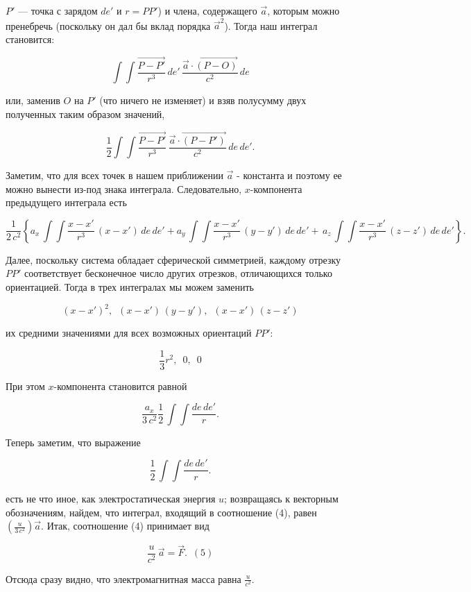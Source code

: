 \documentclass[11pt]{article}
\begin{document}
\(P'\) --- точка с зарядом \(de'\) и \(r = PP'\)) и члена, содержащего
\(\vec {a}\), которым можно пренебречь (поскольку он дал бы вклад порядка
\({\vec {a}}^2\)). Тогда наш интеграл становится:

\[\int \int\frac{\overrightarrow{P-P'}}{r^3}\,de' \, \frac{\vec {a} \cdot \overrightarrow{\left(P - O\right)}}{c^2} \, de\]

    или, заменив \(O\) на \(P'\) (что ничего не изменяет) и взяв полусумму
двух полученных таким образом значений,

\[\frac{1}{2} \int \int\frac{\overrightarrow{P-P'}}{r^3} \, \frac{\vec {a} \cdot \overrightarrow{\left(P - P'\right)}}{c^2} \, de\,de'.\]

    Заметим, что для всех точек в нашем приближении \(\vec {a}\) - константа и
поэтому ее можно вынести из-под знака интеграла. Следовательно,
\(x\)-компонента предыдущего интеграла есть

\[\frac{1}{2 \, c^2} \left\{
a_x \, \int \int\frac{{x-x'}}{r^3} \, { {\left(x - x'\right)}} \, de\,de'
+
a_y \, \int \int\frac{{x-x'}}{r^3} \, { {\left(y - y'\right)}} \, de\,de'
+
\, a_z \, \int \int\frac{{x-x'}}{r^3} \, { {\left(z - z'\right)}} \, de\,de'
\right\}.\]

    Далее, поскольку система обладает сферической симметрией, каждому
отрезку \(PP'\) соответствует бесконечное число других отрезков,
отличающихся только ориентацией. Тогда в трех интегралах мы можем
заменить

\[\left(x-x'\right)^2, \,\,\,
\left(x-x'\right) \, \left(y - y'\right), \,\,\,
\left(x-x'\right) \, \left(z - z'\right)\]

их средними значениями для всех возможных ориентаций \(PP'\):

\[\frac{1}{3}r^2, \,\,\,0, \,\,\,0\]

При этом \(x\)-компонента становится равной

\[\frac{a_x}{3 \, c^2}\frac{1}{2} \, \int \int\frac{{de\,de'}}{r}.\]

Теперь заметим, что выражение

\[\frac{1}{2} \, \int \int\frac{{de\,de'}}{r}.\]

есть не что иное, как электростатическая энергия \(u\); возвращаясь к
векторным обозначениям, найдем, что интеграл, входящий в соотношение
(4), равен \(\left(\frac{u}{3 \, c^2}\right) \vec {a}\). Итак, соотношение
(4) принимает вид

\[\frac{u}{c^2} \,\vec {a} = \vec {F}. \,\,\, (5)\]

Отсюда сразу видно, что электромагнитная масса равна \(\frac{u}{c^2}\).
\end{document}
